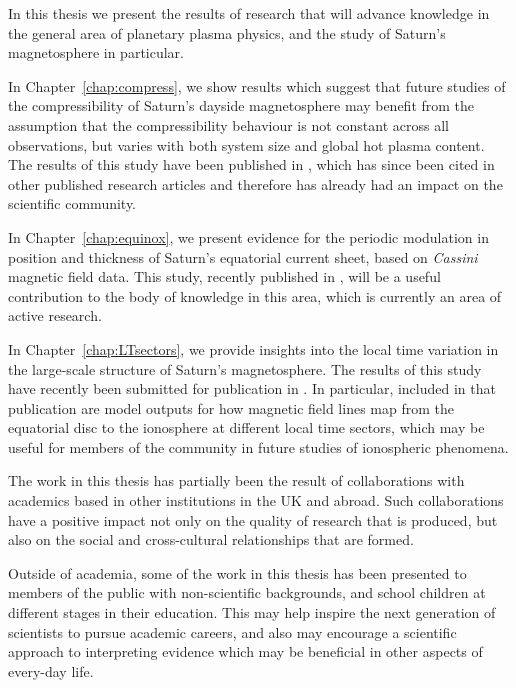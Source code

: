 \begin{impactstatement} %
In this thesis we present the results of research that will advance knowledge in the general area of planetary plasma physics, and the study of Saturn's magnetosphere in particular. 

In Chapter~\ref{chap:compress}, we show results which suggest that future studies of the compressibility of Saturn's dayside magnetosphere may benefit from the assumption that the compressibility behaviour is not constant across all observations,  but varies with both system size and global hot plasma content. The results of this study have been published in \citet{sorba2017}, which has since been cited in other published research articles and therefore has already had an impact on the scientific community. 

In Chapter~\ref{chap:equinox}, we present evidence for the periodic modulation in position and thickness of Saturn's equatorial current sheet, based on \textit{Cassini} magnetic field data. This study, recently published in \citet{sorba2018}, will be a useful contribution to the body of knowledge in this area, which is currently an area of active research.

In Chapter~\ref{chap:LTsectors}, we provide insights into the local time variation in the large-scale structure of Saturn's magnetosphere. 
The results of this study have recently been submitted for publication in \citet[][submitted]{sorba2019}. In particular, included in that publication are model outputs for how magnetic field lines map from the equatorial disc to the ionosphere at different local time sectors, which may be useful for members of the community in future studies of ionospheric phenomena.

The work in this thesis has partially been the result of collaborations with academics based in other institutions in the UK and abroad. Such collaborations have a positive impact not only on the quality of research that is produced, but also on the social and cross-cultural relationships that are formed.

Outside of academia, some of the work in this thesis has been presented to members of the public with non-scientific backgrounds, and school children at different stages in their education. This may help inspire the next generation of scientists to pursue academic careers, and also may encourage a scientific approach to interpreting evidence which may be beneficial in other aspects of every-day life.


\end{impactstatement}
